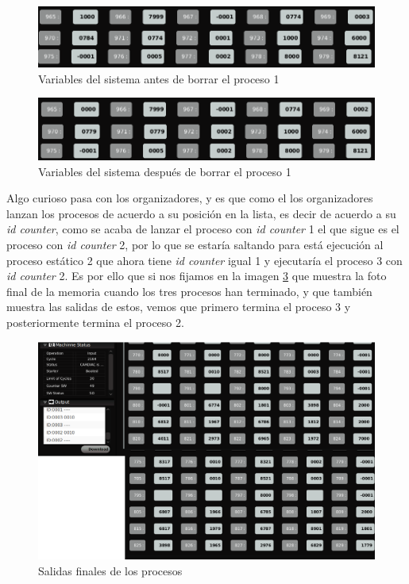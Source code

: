 \documentclass[letterpaper,12pt,oneside]{book}
\begin{document}
		\begin{figure}[h]		
			\centering
			\includegraphics[scale=0.45]{media/CARDIACC/ZVBeforeProceso1Erased.png}
			\caption{ Variables del sistema antes de borrar el proceso 1}
			\label{fig:ZVBeforeProceso1Erased}
		\end{figure}
		
		\begin{figure}[h]		
			\centering
			\includegraphics[scale=0.45]{media/CARDIACC/ZVAfterProceso1Erased.png}
			\caption{ Variables del sistema después de borrar el proceso 1}
			\label{fig:ZVAfterProceso1Erased}
		\end{figure}
		
		Algo curioso pasa con los organizadores, y es que como el los organizadores lanzan los procesos de acuerdo a su posición en la lista, es decir
		de acuerdo a su \textit{id counter}, como se acaba de lanzar el proceso con \textit{id counter} 1 el que sigue es el proceso
		con \textit{id counter} 2, por lo que se estaría saltando para está ejecución al proceso estático 2 que ahora tiene \textit{id counter} igual
		1 y ejecutaría el proceso 3 con \textit{id counter} 2. Es por ello que si nos fijamos en la imagen \ref{fig:FinalProcesos} que muestra
		la foto final de la memoria cuando los tres procesos han terminado, y que también muestra las salidas de estos, vemos que
		primero termina el proceso 3 y posteriormente termina el proceso 2.
		
		\begin{figure}[h]		
			\centering
			\includegraphics[scale=0.38]{media/CARDIACC/FinalProcesos_cut.png}
			\caption{ Salidas finales de los procesos}
			\label{fig:FinalProcesos}
		\end{figure}
		
\end{document}
